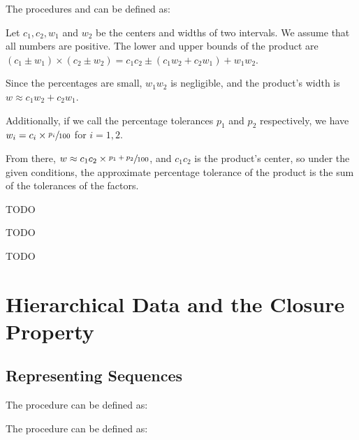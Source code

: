 \begin{exe}[2.12]
    The procedures  and  can be defined 
    as:
\end{exe}

\begin{exe}[2.13]
    Let $c_1, c_2, w_1$ and $w_2$ be the centers and widths of two intervals. We 
    assume that all numbers are positive. The lower and upper bounds of the 
    product are
    $(c_1 \pm w_1) \times (c_2 \pm w_2) = c_1 c_2 \pm (c_1 w_2 + c_2 w_1) + w_1 
    w_2$.

    Since the percentages are small, $w_1 w_2$ is negligible, and the product’s 
    width is $w \approx c_1 w_2 + c_2 w_1$.

    Additionally, if we call the percentage tolerances $p_1$ and $p_2$ 
    respectively, we have $w_i = c_i \times \sfrac{p_i}{100}$ for $i = 1, 2$.

    From there, $w \approx c_1 c_2 \times \sfrac{p_1 + p_2}{100}$, and $c_1 c_2$ 
    is the product’s center, so under the given conditions, the approximate 
    percentage tolerance of the product is the sum of the tolerances of the 
    factors.
\end{exe}

\begin{exe}[2.14]
    TODO
\end{exe}

\begin{exe}[2.15]
    TODO
\end{exe}

\begin{exe}[2.16]
    TODO
\end{exe}

\section{Hierarchical Data and the Closure Property}

\subsection{Representing Sequences}

\begin{exe}[2.17]
    The  procedure can be defined as:
\end{exe}

\begin{exe}[2.18]
    The  procedure can be defined as:
\end{exe}


